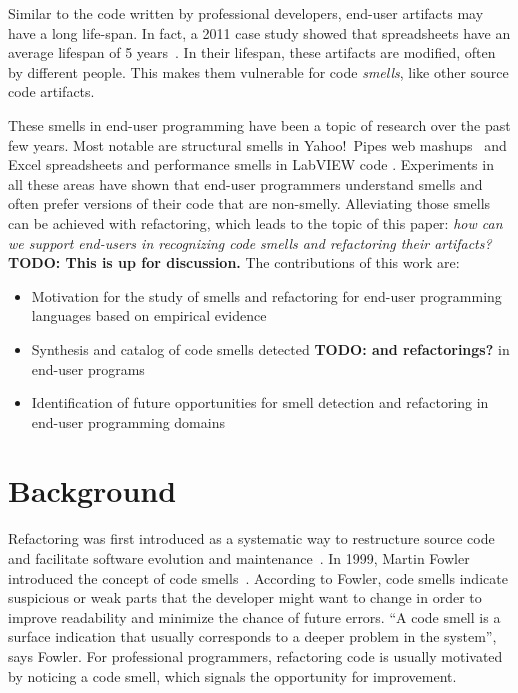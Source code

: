 \documentclass[10pt,conference,compsocconf]{IEEEtran}
\newcommand{\todo}[1]{\textbf{TODO: #1}}
\begin{document}
Similar to the code written by professional developers, end-user artifacts may have a long life-span. In fact, a 2011 case study showed that spreadsheets have an average lifespan of 5 years~\cite{Hermans2011}. In their lifespan, these artifacts are modified, often by different people. This makes them vulnerable for code \emph{smells}, like other source code artifacts. 

These smells in end-user programming have been a topic of research over the past few years. Most notable are structural smells in Yahoo!\ Pipes web mashups~\cite{Stolee2011} and  Excel spreadsheets \cite{Hermans2012inter} and performance smells in LabVIEW code \cite{chambers2013smell}. Experiments in all these areas have shown that end-user programmers understand smells and often prefer versions of their code that are non-smelly. Alleviating those smells can be achieved with refactoring, which leads to the topic of this paper: \emph{how can we support end-users in recognizing code smells and refactoring their artifacts?} \todo{This is up for discussion.} The contributions of this work are:

\begin{itemize}
	\item Motivation for the study of smells and refactoring for end-user programming languages based on empirical evidence
	\item Synthesis and catalog of code smells detected \todo{and refactorings?} in end-user programs
	\item Identification of future opportunities for smell detection and refactoring in end-user programming domains
\end{itemize}

\section{Background}
\label{sec:background}


Refactoring was first introduced as a systematic way to restructure source code and facilitate software evolution and maintenance~\cite{Opdyke:1992:ROF:169783, Griswold:1993:AAP:152388.152389}. In 1999, Martin Fowler introduced the concept of code smells~\cite{Fowl1999}. 
According to Fowler, code smells indicate suspicious or weak parts that the developer might want to change in order to improve readability and minimize the chance of future errors. ``A code smell is a surface indication that usually corresponds to a deeper problem in the system'', says Fowler. For professional programmers, refactoring code is usually motivated by noticing a code smell, which signals the opportunity for improvement.
\end{document}
